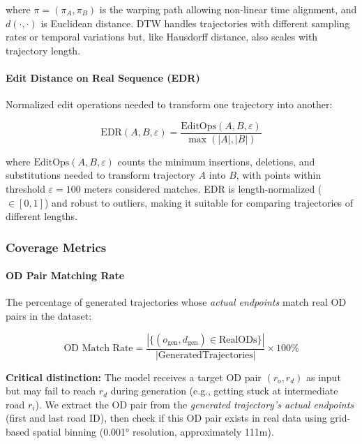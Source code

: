 where $\pi = (\pi_A, \pi_B)$ is the warping path allowing non-linear time alignment, and $d(\cdot, \cdot)$ is Euclidean distance. DTW handles trajectories with different sampling rates or temporal variations but, like Hausdorff distance, also scales with trajectory length.

\paragraph{Edit Distance on Real Sequence (EDR)}

Normalized edit operations needed to transform one trajectory into another:

\begin{equation}
\text{EDR}(A, B, \varepsilon) = \frac{\text{EditOps}(A, B, \varepsilon)}{\max(|A|, |B|)}
\label{eq:edr-appendix}
\end{equation}

where $\text{EditOps}(A, B, \varepsilon)$ counts the minimum insertions, deletions, and substitutions needed to transform trajectory $A$ into $B$, with points within threshold $\varepsilon = 100$ meters considered matches. EDR is length-normalized ($\in [0,1]$) and robust to outliers, making it suitable for comparing trajectories of different lengths.

\subsubsection{Coverage Metrics}
\label{app:coverage-metrics}

\paragraph{OD Pair Matching Rate}

The percentage of generated trajectories whose \emph{actual endpoints} match real OD pairs in the dataset:

\begin{equation}
\text{OD Match Rate} = \frac{|\{(o_{\text{gen}}, d_{\text{gen}}) \in \text{RealODs}\}|}{|\text{GeneratedTrajectories}|} \times 100\%
\label{eq:od-match-appendix}
\end{equation}

\textbf{Critical distinction:} The model receives a target OD pair $(r_o, r_d)$ as input but may fail to reach $r_d$ during generation (e.g., getting stuck at intermediate road $r_i$). We extract the OD pair from the \emph{generated trajectory's actual endpoints} (first and last road ID), then check if this OD pair exists in real data using grid-based spatial binning (0.001° resolution, approximately 111m).

